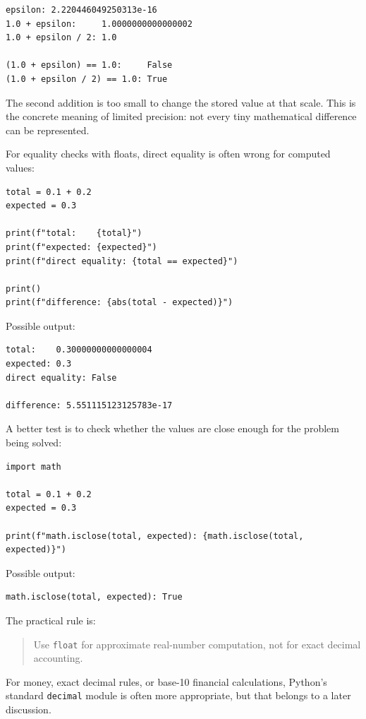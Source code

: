 \begin{verbatim}
epsilon: 2.220446049250313e-16
1.0 + epsilon:     1.0000000000000002
1.0 + epsilon / 2: 1.0

(1.0 + epsilon) == 1.0:     False
(1.0 + epsilon / 2) == 1.0: True
\end{verbatim}

The second addition is too small to change the stored value at that scale. This is the concrete meaning of limited precision: not every tiny mathematical difference can be represented.

For equality checks with floats, direct equality is often wrong for computed values:

\begin{verbatim}
total = 0.1 + 0.2
expected = 0.3

print(f"total:    {total}")
print(f"expected: {expected}")
print(f"direct equality: {total == expected}")

print()
print(f"difference: {abs(total - expected)}")
\end{verbatim}

Possible output:

\begin{verbatim}
total:    0.30000000000000004
expected: 0.3
direct equality: False

difference: 5.551115123125783e-17
\end{verbatim}

A better test is to check whether the values are close enough for the problem being solved:

\begin{verbatim}
import math

total = 0.1 + 0.2
expected = 0.3

print(f"math.isclose(total, expected): {math.isclose(total, expected)}")
\end{verbatim}

Possible output:

\begin{verbatim}
math.isclose(total, expected): True
\end{verbatim}

The practical rule is:

\begin{quote}
Use \texttt{float} for approximate real-number computation, not for exact decimal accounting.
\end{quote}

For money, exact decimal rules, or base-10 financial calculations, Python's standard \texttt{decimal} module is often more appropriate, but that belongs to a later discussion.

